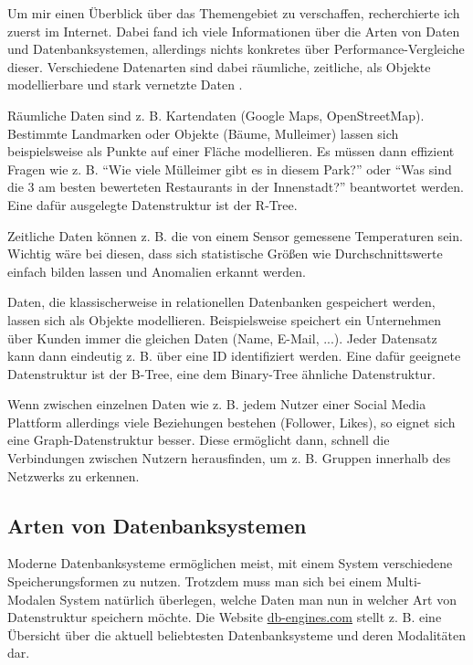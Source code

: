\documentclass[11pt,a4paper]{article}
\begin{document}
Um mir einen Überblick über das Themengebiet zu verschaffen, recherchierte ich zuerst
im Internet. Dabei fand ich viele Informationen über die Arten von Daten und
Datenbanksystemen, allerdings nichts konkretes über Performance-Vergleiche dieser.
Verschiedene Datenarten sind dabei räumliche, zeitliche, als Objekte modellierbare und stark vernetzte Daten
\cite{no_sql_wikipedia} \cite{indian_overview}.

\vspace*{0.3cm}

Räumliche Daten sind z. B. Kartendaten (Google Maps, OpenStreetMap). Bestimmte Landmarken oder Objekte
(Bäume, Mulleimer) lassen sich beispielsweise als Punkte auf einer Fläche modellieren.
Es müssen dann effizient Fragen wie z. B. ``Wie viele Mülleimer gibt es in diesem Park?'' oder ``Was sind
die 3 am besten bewerteten Restaurants in der Innenstadt?'' beantwortet werden.
Eine dafür ausgelegte Datenstruktur ist der R-Tree.

\vspace*{0.3cm}

Zeitliche Daten können z. B. die von einem Sensor gemessene Temperaturen sein.
Wichtig wäre bei diesen, dass sich statistische Größen wie Durchschnittswerte einfach
bilden lassen und Anomalien erkannt werden.

\vspace*{0.3cm}

Daten, die klassischerweise in relationellen Datenbanken gespeichert werden,
lassen sich als Objekte modellieren.
Beispielsweise speichert ein Unternehmen über Kunden immer die gleichen Daten
(Name, E-Mail, ...). Jeder Datensatz kann dann eindeutig z. B. über eine
ID identifiziert werden. Eine dafür geeignete Datenstruktur ist der B-Tree, eine
dem Binary-Tree ähnliche Datenstruktur.

\vspace*{0.3cm}

Wenn zwischen einzelnen Daten wie z. B. jedem Nutzer einer Social Media Plattform
allerdings viele Beziehungen bestehen (Follower, Likes), so eignet sich eine
Graph-Datenstruktur besser. Diese ermöglicht dann, schnell die Verbindungen
zwischen Nutzern herausfinden, um z. B. Gruppen innerhalb des Netzwerks zu erkennen.

\subsection{Arten von Datenbanksystemen}

Moderne Datenbanksysteme ermöglichen meist, mit einem System verschiedene
Speicherungsformen zu nutzen. Trotzdem muss man sich bei einem Multi-Modalen System
natürlich überlegen, welche Daten man nun in welcher Art von Datenstruktur speichern
möchte. Die Website \href{https://db-engines.com/en/ranking}{db-engines.com} stellt z. B.
eine Übersicht über die aktuell beliebtesten Datenbanksysteme und deren Modalitäten dar.
\end{document}
